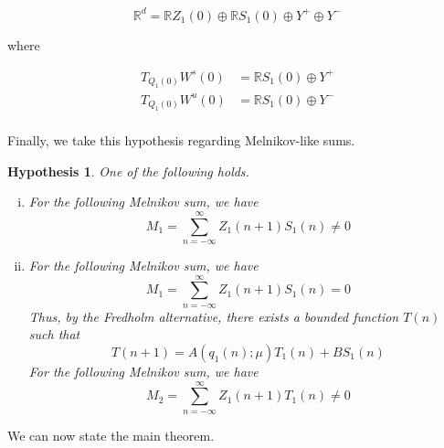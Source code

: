\documentclass[12pt]{article}
\def\R{{\mathbb R}}
\newtheorem{hypothesis}{Hypothesis}
\begin{document}
\begin{equation}\label{tangentdecomp}
\R^d = \R Z_1(0) \oplus \R S_1(0) \oplus Y^+ \oplus Y^-
\end{equation}

where 

\begin{align*}
T_{Q_1(0)}W^s(0) &= \R S_1(0) \oplus Y^+ \\
T_{Q_1(0)}W^u(0) &= \R S_1(0) \oplus Y^- \\
\end{align*}

Finally, we take this hypothesis regarding Melnikov-like sums.

\begin{hypothesis}\label{melnikovhyp}
One of the following holds.
\begin{enumerate}[(i)]
\item For the following Melnikov sum, we have
\[
M_1 = \sum_{n = -\infty}^\infty Z_1(n+1) S_1(n) \neq 0
\]
\item For the following Melnikov sum, we have
\[
M_1 = \sum_{n = -\infty}^\infty Z_1(n+1) S_1(n) = 0
\]
Thus, by the Fredholm alternative, there exists a bounded function $T(n)$ such that 
\[
T(n+1) = A(q_1(n); \mu) T_1(n) + B S_1(n)
\]
For the following Melnikov sum, we have
\[
M_2 = \sum_{n = -\infty}^\infty Z_1(n+1) T_1(n) \neq 0 
\]
\end{enumerate}
\end{hypothesis}

We can now state the main theorem.
\end{document}
